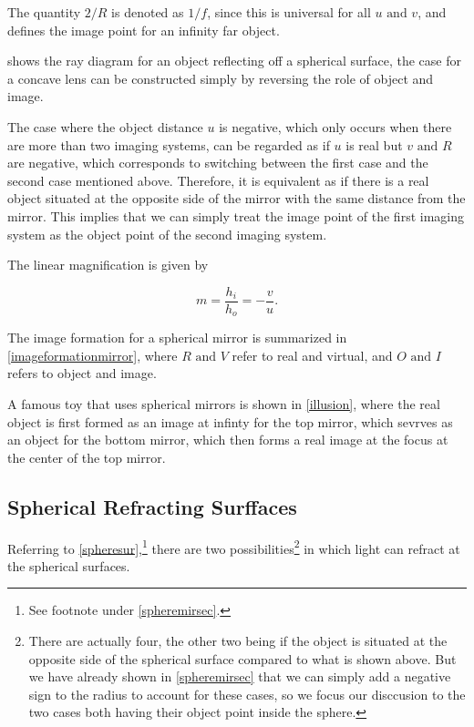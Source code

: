 \documentclass[english,a4paper,12pt]{report}
\begin{document}
The quantity \(2/R\) is denoted as \(1/f\), since this is universal for all \(u \text { and } v\), and defines the image point for an infinity far object.   

 shows the ray diagram for an object reflecting off a spherical surface, the case for a concave lens can be constructed simply by reversing the role of object and image.


The case where the object distance \(u\) is negative, which only occurs when there are more than two imaging systems, can be regarded as if \(u\) is real but \(v \text { and } R\) are negative, which corresponds to switching between the first case and the second case mentioned above. Therefore, it is equivalent as if there is a real object situated at the opposite side of the mirror with the same distance from the mirror. This implies that we can simply treat the image point of the first imaging system as the object point of the second imaging system.

The linear magnification is given by 

\begin{equation}
    m = \frac{h_{i} }{h_{o} } = -\frac{ v}{ u}.  
\end{equation}

The image formation for a spherical mirror is summarized in \cref{imageformationmirror}, where \(R \text { and }  V\) refer to real and virtual, and \(O \text { and } I\) refers to object and image.


A famous toy that uses spherical mirrors is shown in \cref{illusion}, where the real object is first formed as an image at infinty for the top mirror, which sevrves as an object for the bottom mirror, which then forms a real image at the focus at the center of the top mirror.


\subsection{Spherical Refracting Surffaces}

Referring to \cref{spheresur},\footnote{See footnote under \cref{spheremirsec}.} there are two possibilities\footnote{There are actually four, the other two being if the object is situated at the opposite side of the spherical surface compared to what is shown above. But we have already shown in \cref{spheremirsec} that we can simply add a negative sign to the radius to account for these cases, so we focus our disccusion to the two cases both having their object point inside the sphere.}  in which light can refract at the spherical surfaces.
\end{document}
